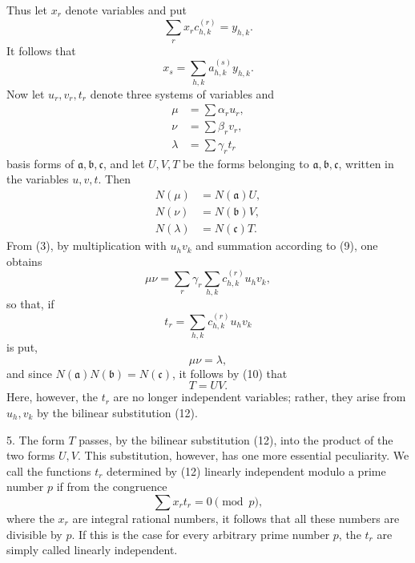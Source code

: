 \documentclass[11pt]{article}
\begin{document}
Thus let $x_r$ denote variables and put
\begin{equation}
 \sum_r x_rc_{h,k}^{(r)}=y_{h,k}.\tag{7}
\end{equation}
It follows that
\begin{equation}
 x_s=\sum_{h,k}a_{h,k}^{(s)}y_{h,k}.\tag{8}
\end{equation}
Now let $u_r,v_r,t_r$ denote three systems of variables and
\begin{equation}
\begin{aligned}
 \mu&=\sum\alpha_ru_r,\\
 \nu&=\sum\beta_rv_r,\\
 \lambda&=\sum\gamma_rt_r
\end{aligned}\tag{9}
\end{equation}
basis forms of $\mathfrak a,\mathfrak b,\mathfrak c$, and let $U,V,T$ be the forms belonging to $\mathfrak a,\mathfrak b,\mathfrak c$, written in the variables $u,v,t$. Then
\begin{equation}
\begin{aligned}
 N(\mu)&=N(\mathfrak a)U,\\
 N(\nu)&=N(\mathfrak b)V,\\
 N(\lambda)&=N(\mathfrak c)T.
\end{aligned}\tag{10}
\end{equation}
From (3), by multiplication with $u_hv_k$ and summation according to (9), one obtains
\begin{equation}
 \mu\nu=\sum_r\gamma_r\sum_{h,k}c_{h,k}^{(r)}u_hv_k,\tag{11}
\end{equation}
so that, if
\begin{equation}
 t_r=\sum_{h,k}c_{h,k}^{(r)}u_hv_k\tag{12}
\end{equation}
is put,
\begin{equation}
 \mu\nu=\lambda,\tag{13}
\end{equation}
and since $N(\mathfrak a)N(\mathfrak b)=N(\mathfrak c)$, it follows by (10) that
\begin{equation}
 T=UV.\tag{14}
\end{equation}
Here, however, the $t_r$ are no longer independent variables; rather, they arise from $u_h,v_k$ by the bilinear substitution (12).

5. The form $T$ passes, by the bilinear substitution (12), into the product of the two forms $U,V$. This substitution, however, has one more essential peculiarity. We call the functions $t_r$ determined by (12) linearly independent modulo a prime number $p$ if from the congruence
\begin{equation}
 \sum x_rt_r=0\pmod p,\tag{15}
\end{equation}
where the $x_r$ are integral rational numbers, it follows that all these numbers are divisible by $p$. If this is the case for every arbitrary prime number $p$, the $t_r$ are simply called linearly independent.
\end{document}
